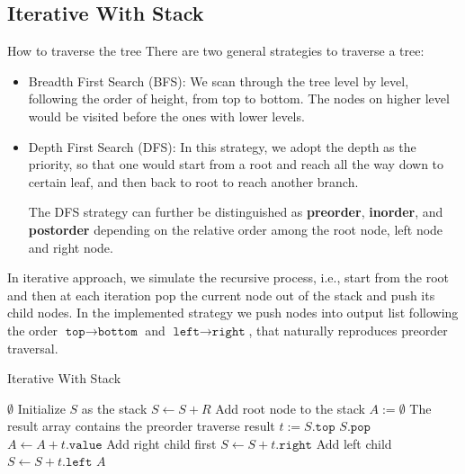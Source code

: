 \subsection{Iterative With Stack}
How to traverse the tree
There are two general strategies to traverse a tree:
\begin{itemize}
    \item Breadth First Search (BFS): We scan through the tree level by level, following the order of height, from top to bottom. The nodes on higher level would be visited before the ones with lower levels.
    \item Depth First Search (DFS): In this strategy, we adopt the depth as the priority, so that one would start from a root and reach all the way down to certain leaf, and then back to root to reach another branch.
    \par
    The DFS strategy can further be distinguished as \textbf{preorder}, \textbf{inorder}, and \textbf{postorder} depending on the relative order among the root node, left node and right node.
\end{itemize}
In iterative approach, we simulate the recursive process, i.e., start from the root and then at each iteration pop the current node out of the stack and push its child nodes. In the implemented strategy we push nodes into output list following the order $\texttt{top}\to\texttt{bottom}$ and $\texttt{left}\to\texttt{right}$, that naturally reproduces preorder traversal.
\setcounter{algorithm}{0}
\begin{algorithm}[H]
\caption{Iterative With Stack}
\begin{algorithmic}[1]
\State \Return $\emptyset$
\EndIf
\State Initialize $S$ as the stack
\State $S\gets S + R$ \Comment Add root node to the stack
\State $A:=\emptyset$ \Comment The result array contains the preorder traverse result
\State $t:=S.\texttt{top}$
\State $S.\texttt{pop}$
\State $A\gets A+t.\texttt{value}$
 \Comment Add right child first
\State $S\gets S+t.\texttt{right}$
\EndIf
{} \Comment Add left child
\State $S\gets S+t.\texttt{left}$
\EndIf
\EndWhile
\State \Return $A$
\EndProcedure
\end{algorithmic}
\end{algorithm}
